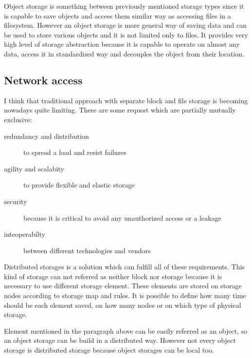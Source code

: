 Object storage is something between previously mentioned storage types since it is capable to save objects and access them similar way as accessing files in a filesystem. However an object storage is more general way of saving data and can be used to store various objects and it is not limited only to files. It provides very high level of storage abstraction because it is capable to operate on almost any data, access it in standardized way and decouples the object from their location.
\label{par:object-storage}


\subsection{Network access}
I think that traditional approach with separate block and file storage is becoming nowadays quite limiting. There are some request which are partially mutually exclusive:
\begin{description}
	\item[redundancy and distribution] to spread a load and resist failures
	\item[agility and scalabity] to provide flexible and elastic storage
	\item[security] because it is critical to avoid any unauthorized access or a leakage
	\item[inteoperabilty] between different technologies and vendors
\end{description}

Distributed storages is a solution which can fulfill all of these requirements. This kind of storage can not referred as neither block nor storage because it is necessary to use different storage element. These elements are stored on storage nodes according to storage map and rules. It is possible to define how many time should be each element saved, on how many nodes or on which type of physical storage.

Element mentioned in the paragraph above can be easily referred as an object, so an object storage can be build in a distributed way. However not every object storage is distributed storage because object storages can be local too.

